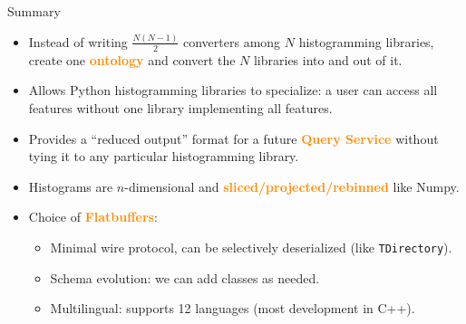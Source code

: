 \documentclass[aspectratio=169]{beamer}
\begin{document}
\begin{frame}{Summary}
\large
\vspace{0.4 cm}
\begin{itemize}\setlength{\itemsep}{0.3 cm}
\item Instead of writing $\frac{N(N - 1)}{2}$ converters among $N$ histogramming libraries, create one \textcolor{darkorange}{\bf ontology} and convert the $N$ libraries into and out of it.

\item Allows Python histogramming libraries to specialize: a user can access all features without one library implementing all features.

\item Provides a ``reduced output'' format for a future \textcolor{darkorange}{\bf Query Service} without tying it to any particular histogramming library.

\item Histograms are $n$-dimensional and \textcolor{darkorange}{\bf sliced/projected/rebinned} like Numpy.

\item Choice of \textcolor{darkorange}{\bf Flatbuffers}:

\vspace{0.25 cm}
\begin{itemize}\setlength{\itemsep}{0.25 cm}
\item {\large Minimal wire protocol, can be selectively deserialized (like {\tt\small TDirectory}).}
\item {\large Schema evolution: we can add classes as needed.}
\item {\large Multilingual: supports 12 languages (most development in C++).}
\end{itemize}
\end{itemize}
\end{frame}
\end{document}
